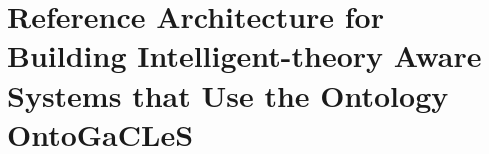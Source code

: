 
\section[Reference Architecture for Building Intelligent-theory Aware Systems]{Reference Architecture for Building Intelligent-theory Aware Systems that Use the Ontology OntoGaCLeS}
\label{sec:reference-architecture}









